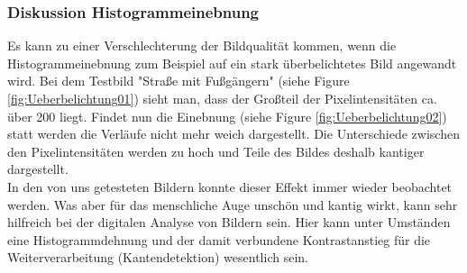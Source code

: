 \documentclass[12pt,german]{article}
\begin{document}
\pagebreak
\subsubsection {Diskussion Histogrammeinebnung}
Es kann zu einer Verschlechterung der Bildqualität kommen, wenn die Histogrammeinebnung zum Beispiel auf ein stark überbelichtetes Bild angewandt wird. Bei dem Testbild "Straße mit Fußgängern"  (siehe Figure \ref{fig:Ueberbelichtung01}) sieht man, dass der Großteil der Pixelintensitäten ca. über 200 liegt. Findet nun die Einebnung  (siehe Figure \ref{fig:Ueberbelichtung02}) statt werden die Verläufe nicht mehr weich dargestellt. Die Unterschiede zwischen den Pixelintensitäten werden zu hoch und Teile des Bildes deshalb kantiger dargestellt.\\
In den von uns getesteten Bildern konnte dieser Effekt immer wieder beobachtet werden. Was aber für das menschliche Auge unschön und kantig wirkt, kann sehr hilfreich bei der digitalen Analyse von Bildern sein. Hier kann unter Umständen eine Histogrammdehnung und der damit verbundene Kontrastanstieg für die Weiterverarbeitung (Kantendetektion) wesentlich sein.
\end{document}
